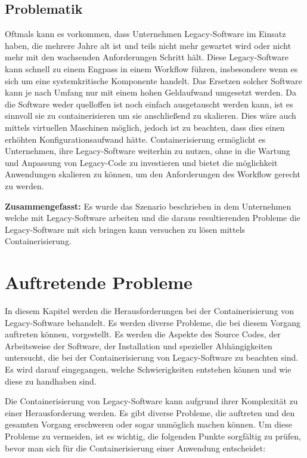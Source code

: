 \subsection{Problematik}
Oftmals kann es vorkommen, dass Unternehmen Legacy-Software im Einsatz haben, die mehrere Jahre alt ist und teils nicht mehr gewartet wird oder nicht mehr mit den wachsenden Anforderungen Schritt hält. Diese Legacy-Software kann schnell zu einem Engpass in einem Workflow führen, insbesondere wenn es sich um eine systemkritische Komponente handelt. Das Ersetzen solcher Software kann je nach Umfang nur mit einem hohen Geldaufwand umgesetzt werden. Da die Software weder quelloffen ist noch einfach ausgetauscht werden kann, ist es sinnvoll sie zu containerisieren um sie anschließend zu skalieren. Dies wäre auch mittels virtuellen Maschinen möglich, jedoch ist zu beachten, dass dies einen erhöhten Konfigurationsaufwand hätte. Containerisierung ermöglicht es Unternehmen, ihre Legacy-Software weiterhin zu nutzen, ohne in die Wartung und Anpassung von Legacy-Code zu investieren und bietet die möglichkeit Anwendungen skalieren zu können, um den Anforderungen des Workflow gerecht zu werden.

\textbf{Zusammengefasst:}
Es wurde das Szenario beschrieben in dem Unternehmen welche mit Legacy-Software arbeiten und die daraus resultierenden Probleme die Legacy-Software mit sich bringen kann versuchen zu lösen mittels Containerisierung.
\section{Auftretende Probleme}

In diesem Kapitel werden die Herausforderungen bei der Containerisierung von Legacy-Software behandelt. Es werden diverse Probleme, die bei diesem Vorgang auftreten können, vorgestellt. Es werden die Aspekte des Source Codes, der Arbeitsweise der Software, der Installation und spezieller Abhängigkeiten untersucht, die bei der Containerisierung von Legacy-Software zu beachten sind. Es wird darauf eingegangen, welche Schwierigkeiten entstehen können und wie diese zu handhaben sind.

Die Containerisierung von Legacy-Software kann aufgrund ihrer Komplexität zu einer Herausforderung werden. Es gibt diverse Probleme, die auftreten und den gesamten Vorgang erschweren oder sogar unmöglich machen können. Um diese Probleme zu vermeiden, ist es wichtig, die folgenden Punkte sorgfältig zu prüfen, bevor man sich für die Containerisierung einer Anwendung entscheidet:

